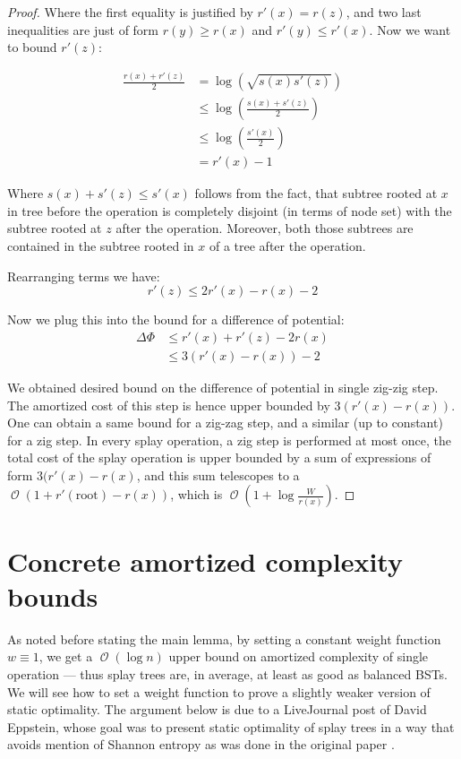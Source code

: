 \documentclass[11pt]{article}
\DeclareMathOperator*{\Oh}{\mathcal{O}}
\begin{document}
\begin{proof}
Where the first equality is justified by $r'(x) = r(z)$, and two last inequalities are just of form $r(y) \geq r(x)$ and $r'(y) \leq r'(x)$. Now we want to bound $r'(z)$:

\begin{align*}
\frac{r(x) + r'(z)}{2} &= \log(\sqrt{s(x)s'(z)}) \\
	& \leq \log(\frac{s(x) + s'(z)}{2}) \\
	& \leq \log(\frac{s'(x)}{2}) \\
	& = r'(x) - 1
\end{align*}

Where $s(x) + s'(z) \leq s'(x)$ follows from the fact, that subtree rooted at $x$ in tree before the operation is completely disjoint (in terms of node set) with the subtree rooted at $z$ after the operation. Moreover, both those subtrees are contained in the subtree rooted in $x$ of a tree after the operation.

Rearranging terms we have:
\begin{equation*}
	r'(z) \leq 2r'(x) - r(x) - 2
\end{equation*}

Now we plug this into the bound for a difference of potential:
\begin{align*}
\Delta\Phi & \leq r'(x) + r'(z) - 2r(x) \\
	& \leq 3 (r'(x) - r(x)) - 2
\end{align*}

We obtained desired bound on the difference of potential in single zig-zig step. The amortized cost of this step is hence upper bounded by $3(r'(x) - r(x))$. One can obtain a same bound for a zig-zag step, and a similar (up to constant) for a zig step. In every splay operation, a zig step is performed at most once, the total cost of the splay operation is upper bounded by a sum of expressions of form $3(r'(x) - r(x)$, and this sum telescopes to a $\Oh(1 + r'(\mathrm{root}) - r(x))$, which is $\Oh(1 + \log\frac{W}{r(x)})$.
\end{proof}
\section{Concrete amortized complexity bounds}
As noted before stating the main lemma, by setting a constant weight function $w \equiv 1$, we get a $\Oh(\log n)$ upper bound on amortized complexity of single operation --- thus splay trees are, in average, at least as good as balanced BSTs. We will see how to set a weight function to prove a slightly weaker version of static optimality. The argument below is due to a LiveJournal post of David Eppstein, whose goal was to present static optimality of splay trees in a way that avoids mention of Shannon entropy as was done in the original paper \cite{DBLP:journals/jacm/SleatorT85}.
\end{document}
